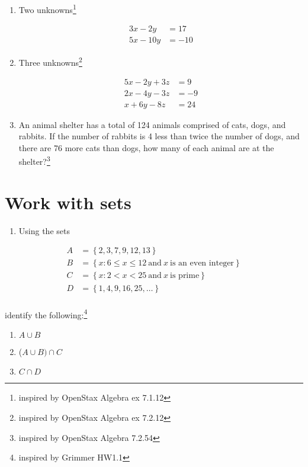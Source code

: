 \documentclass[
]{article}
\providecommand{\tightlist}{%
  \setlength{\itemsep}{0pt}\setlength{\parskip}{0pt}}
\begin{document}
\begin{enumerate}
\def\labelenumi{\alph{enumi}.}
\item
  Two unknowns\footnote{inspired by OpenStax Algebra ex 7.1.12}

  \[
   \begin{aligned}
   3x - 2y &= 17 \\
   5x - 10y &= -10
   \end{aligned}
   \]
\item
  Three unknowns\footnote{inspired by OpenStax Algebra ex 7.2.12}

  \[
   \begin{aligned}
   5x - 2y + 3z &= 9 \\
   2x - 4y - 3z &= -9 \\
   x + 6y - 8z &= 24
   \end{aligned}
   \]
\item
  An animal shelter has a total of 124 animals comprised of cats, dogs,
  and rabbits. If the number of rabbits is 4 less than twice the number
  of dogs, and there are 76 more cats than dogs, how many of each animal
  are at the shelter?\footnote{inspired by OpenStax Algebra 7.2.54}
\end{enumerate}

\section{Work with sets}\label{work-with-sets}

\begin{enumerate}
\def\labelenumi{\arabic{enumi}.}
\setcounter{enumi}{5}
\tightlist
\item
  Using the sets
\end{enumerate}

\[
\begin{aligned}
A&=\left\{2,3,7,9,12,13 \right\} \\
B&=\left\{ x: 6\leq x \leq 12 \  \mbox{and} \ x \ \mbox{is an even integer} \right\} \\
C&=\left\{ x: 2< x < 25 \  \mbox{and} \  x \  \mbox{is prime}  \right\} \\
D&=\left\{ 1,4,9,16,25, \ldots  \right\} \\
\end{aligned}
\]

identify the following:\footnote{inspired by Grimmer HW1.1}

\begin{enumerate}
\def\labelenumi{\arabic{enumi}.}
\item
  \(A\cup B\)
\item
  (\(A\cup B) \cap C\)
\item
  \(C \cap D\)
\end{enumerate}
\end{document}
